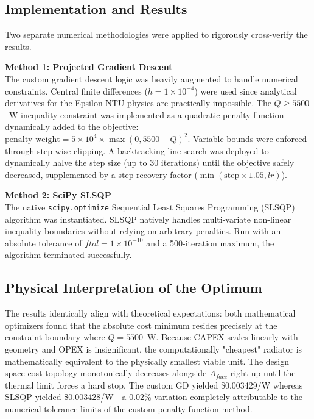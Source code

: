 \documentclass[12pt, a4paper]{article}
\begin{document}
\subsection{Implementation and Results}
Two separate numerical methodologies were applied to rigorously cross-verify the results.

\textbf{Method 1: Projected Gradient Descent} \\
The custom gradient descent logic was heavily augmented to handle numerical constraints. Central finite differences ($h = 1 \times 10^{-4}$) were used since analytical derivatives for the Epsilon-NTU physics are practically impossible. The $Q \geq 5500$~W inequality constraint was implemented as a quadratic penalty function dynamically added to the objective: $\text{penalty\_weight} = 5 \times 10^4 \times \max(0, 5500 - Q)^2$. Variable bounds were enforced through step-wise clipping. A backtracking line search was deployed to dynamically halve the step size (up to 30 iterations) until the objective safely decreased, supplemented by a step recovery factor ($\min(\text{step} \times 1.05, lr)$). 

\textbf{Method 2: SciPy SLSQP} \\
The native \texttt{scipy.optimize} Sequential Least Squares Programming (SLSQP) algorithm was instantiated. SLSQP natively handles multi-variate non-linear inequality boundaries without relying on arbitrary penalties. Run with an absolute tolerance of $ftol = 1 \times 10^{-10}$ and a 500-iteration maximum, the algorithm terminated successfully.

\subsection{Physical Interpretation of the Optimum}
The results identically align with theoretical expectations: both mathematical optimizers found that the absolute cost minimum resides precisely at the constraint boundary where $Q = 5500$~W. Because CAPEX scales linearly with geometry and OPEX is insignificant, the computationally "cheapest" radiator is mathematically equivalent to the physically smallest viable unit. The design space cost topology monotonically decreases alongside $A_{face}$ right up until the thermal limit forces a hard stop. The custom GD yielded \$0.003429/W whereas SLSQP yielded \$0.003428/W---a 0.02\% variation completely attributable to the numerical tolerance limits of the custom penalty function method.
\end{document}
